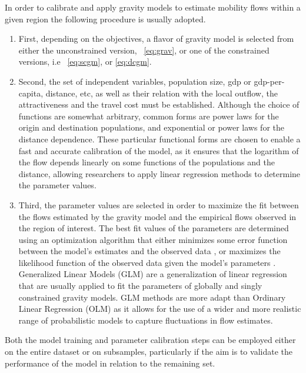  In order to calibrate and apply gravity models to estimate mobility flows within a given region the following procedure is usually adopted. 
\begin{enumerate}
%
\item First, depending on the objectives, a flavor of gravity model is selected from either the unconstrained version, \equationname~\eqref{eq:grav}, or one of the constrained versions, i.e  \equationname~\eqref{eq:scgm}, or \equationname\eqref{eq:dcgm}.%

\item Second, the set of independent variables, population size, gdp or gdp-per-capita, distance, etc, as well as their relation with the local outflow, the attractiveness and the travel cost must be established. Although the choice of functions are somewhat arbitrary, common forms are power laws for the origin and destination populations, and exponential or power laws for the distance dependence. 
These particular functional forms are chosen to enable a fast and accurate calibration of the model, as it ensures that the logarithm of the flow depends linearly on some functions of the populations and the distance, allowing researchers to apply linear regression methods to determine the parameter values. 
%
\item Third, the parameter values are selected in order to maximize the fit between the flows estimated by the gravity model and the empirical flows observed in the region of interest. 
The best fit values of the parameters are determined using an optimization algorithm that either minimizes some error function between the model's estimates and the observed data \cite{cha_2007_comprehensive}, or maximizes the likelihood function of the observed data given the model's parameters \cite{flowerdew_1982_method}. 
Generalized Linear Models (GLM) \cite{nelder_1972_generalized} are a generalization of linear regression that are usually applied to fit the parameters of globally and singly constrained gravity models. 
GLM methods are more adapt than Ordinary Linear Regression (OLM) as it allows for the use of a wider and more realistic range of  probabilistic models to capture fluctuations in flow estimates. 
\end{enumerate}

Both the model training and parameter calibration steps can be employed either on the entire dataset or on subsamples, particularly if the aim is to validate the performance of the model in relation to the remaining set. 

